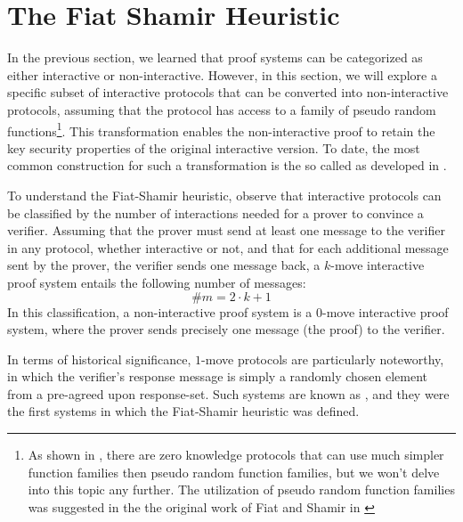 \section{The Fiat Shamir Heuristic}
In the previous section, we learned that proof systems can be categorized as either interactive or non-interactive. However, in this section, we will explore a specific subset of interactive protocols that can be converted into non-interactive protocols, assuming that the protocol has access to a family of pseudo random functions\footnote{As shown in \cite{chen-20}, there are zero knowledge protocols that can use much simpler function families then pseudo random function families, but we won't delve into this topic any further. The utilization of pseudo random function families was suggested in the the original work of Fiat and Shamir in \cite{fiat-86}}. This transformation enables the non-interactive proof to retain the key security properties of the original interactive version. To date, the most common construction for such a transformation is the so called  as developed in \cite{fiat-86}. 

To understand the Fiat-Shamir heuristic, observe that interactive protocols can be classified by the number of interactions needed for a prover to convince a verifier. Assuming that the prover must send at least one message to the verifier in any protocol, whether interactive or not, and that for each additional message sent by the prover, the verifier sends one message back, a $k$-move interactive proof system entails the following number of messages:
\begin{equation}
\label{def:k-move-interactive-protocol}
\#m = 2\cdot k +1
\end{equation}
In this classification, a non-interactive proof system is a $0$-move interactive proof system, where the prover sends precisely one message (the proof) to the verifier. 

In terms of historical significance, $1$-move protocols are particularly noteworthy, in which the verifier's response message is simply a randomly chosen element from a pre-agreed upon response-set. Such systems are known as , and they were the first systems in which the Fiat-Shamir heuristic was defined.

